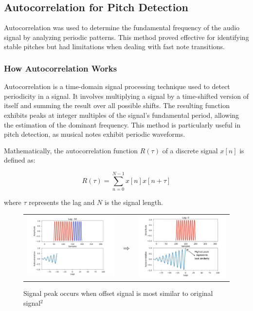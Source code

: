 \documentclass{article}
\begin{document}
\newpage

\subsection{Autocorrelation for Pitch Detection}
Autocorrelation was used to determine the fundamental frequency of the audio signal by analyzing periodic patterns. This method proved effective for identifying stable pitches but had limitations when dealing with fast note transitions.

\subsubsection{How Autocorrelation Works}
Autocorrelation is a time-domain signal processing technique used to detect periodicity in a signal. It involves multiplying a signal by a time-shifted version of itself and summing the result over all possible shifts. The resulting function exhibits peaks at integer multiples of the signal's fundamental period, allowing the estimation of the dominant frequency. This method is particularly useful in pitch detection, as musical notes exhibit periodic waveforms.

Mathematically, the autocorrelation function $R(\tau)$ of a discrete signal $x[n]$ is defined as:

\begin{equation}
R(\tau) = \sum_{n=0}^{N-1} x[n] x[n+\tau]
\end{equation}

where $\tau$ represents the lag and $N$ is the signal length.

\begin{figure}[h]
    \centering
    \begin{tabular}{ccc}
        \includegraphics[width=60mm]{docs/LiteratureReview/images/autocorrelation.png} & 
        $\Longrightarrow$ & 
        \includegraphics[width=60mm]{docs/LiteratureReview/images/autocorrelation Peak.png} \\
    \end{tabular}
    \caption{Signal peak occurs when offset signal is most similar to original signal$^2$}
    \label{fig:autocorrelation_peak}
\end{figure}
\end{document}
